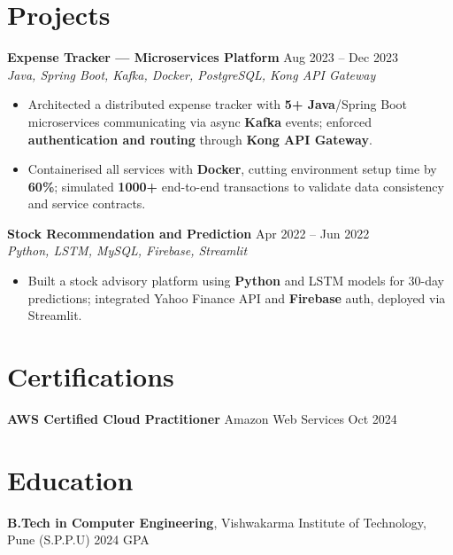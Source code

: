 \documentclass[10pt,letterpaper]{article}
\newcommand{\resumeSubheading}[4]{%
  \textbf{#1} \hfill #2 \\
  \textit{#3} \hfill \textit{#4} \\
}
\begin{document}
\section*{Projects}
\resumeSubheading{Expense Tracker --- Microservices Platform}{Aug 2023 -- Dec 2023}{}{Java, Spring Boot, Kafka, Docker, PostgreSQL, Kong API Gateway}
\begin{itemize}
    \item Architected a distributed expense tracker with \textbf{5+ Java}/Spring Boot microservices communicating via async \textbf{Kafka} events; enforced \textbf{authentication and routing} through \textbf{Kong API Gateway}.
    \item Containerised all services with \textbf{Docker}, cutting environment setup time by \textbf{60\%}; simulated \textbf{1000+} end-to-end transactions to validate data consistency and service contracts.
\end{itemize}
\resumeSubheading{Stock Recommendation and Prediction}{Apr 2022 -- Jun 2022}{}{Python, LSTM, MySQL, Firebase, Streamlit}
\begin{itemize}
    \item Built a stock advisory platform using \textbf{Python} and LSTM models for 30-day predictions; integrated Yahoo Finance API and \textbf{Firebase} auth, deployed via Streamlit.
\end{itemize}

\section*{Certifications}
\textbf{AWS Certified Cloud Practitioner} \hfill Amazon Web Services \enspace\textbar\enspace Oct 2024

\section*{Education}
\textbf{B.Tech in Computer Engineering}, Vishwakarma Institute of Technology, Pune (S.P.P.U) \hfill 2024 \enspace\textbar{} GPA
\end{document}
